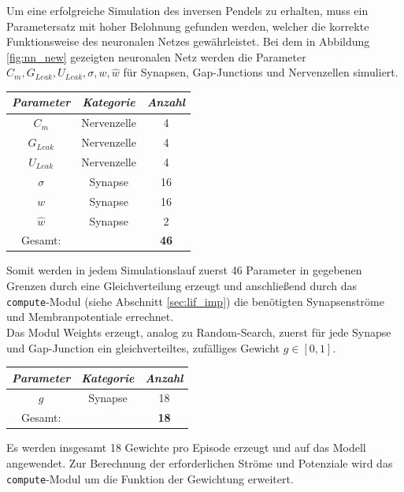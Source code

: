 	Um eine erfolgreiche Simulation des inversen Pendels zu erhalten, muss ein Parametersatz mit hoher Belohnung gefunden werden, welcher die korrekte Funktionsweise des neuronalen Netzes gewährleistet. Bei dem in Abbildung \ref{fig:nn_new} gezeigten neuronalen Netz werden die Parameter $C_m, G_{Leak}, U_{Leak}, \sigma, w, \hat{w}$ für Synapsen, Gap-Junctions und Nervenzellen simuliert.
	\begin{center}
		\begin{tabular}{c@{\hskip 0.5cm}c@{\hskip 0.5cm}c@{\hskip 0.5cm}}    \toprule
			\setlength{\tabcolsep}{50pt}
			\renewcommand{\arraystretch}{1.5}
			\emph{Parameter}	& \emph{Kategorie}  & \emph{Anzahl} \\\midrule
			$C_m$				& Nervenzelle		& 4				\\ 
			$G_{Leak}$	 		& Nervenzelle		& 4				\\
			$U_{Leak}$	 		& Nervenzelle		& 4				\\
			$\sigma$			& Synapse			& 16			\\
			$w$					& Synapse			& 16			\\ 
			$\hat{w}$			& Synapse			& 2				\\\bottomrule
			Gesamt:				&					& \textbf{46}	\\
			\hline
		\end{tabular}
	\end{center}
	Somit werden in jedem Simulationslauf zuerst 46 Parameter in gegebenen Grenzen durch eine Gleichverteilung erzeugt und anschließend durch das \texttt{compute}-Modul (siehe Abschnitt \ref{sec:lif_imp}) die benötigten Synapsenströme und Membranpotentiale errechnet.\\
	Das Modul Weights erzeugt, analog zu Random-Search, zuerst für jede Synapse und Gap-Junction ein gleichverteiltes, zufälliges Gewicht $g\in[0,1]$.
	\begin{center}
		\begin{tabular}{c@{\hskip 0.5cm}c@{\hskip 0.5cm}c@{\hskip 0.5cm}}    \toprule
			\setlength{\tabcolsep}{50pt}
			\renewcommand{\arraystretch}{1.5}
			\emph{Parameter}	& \emph{Kategorie}  & \emph{Anzahl} \\\midrule
			$g$					& Synapse			& 18			\\\bottomrule
			Gesamt:				&					& \textbf{18}	\\
			\hline
		\end{tabular}
	\end{center}
	Es werden insgesamt 18 Gewichte pro Episode erzeugt und auf das Modell angewendet. Zur Berechnung der erforderlichen Ströme und Potenziale wird das \texttt{compute}-Modul um die Funktion der Gewichtung erweitert.
	
